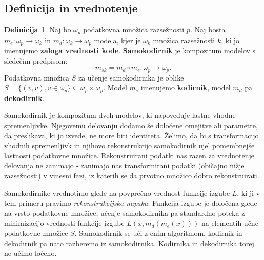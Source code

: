 \documentclass[12pt,a4paper,twoside]{article}
\theoremstyle{definition} %
\newtheorem{definicija}{Definicija}[section]
\theoremstyle{plain} %
\numberwithin{equation}{section}  %
\begin{document}

\subsection{Definicija in vrednotenje}

\begin{definicija}
\label{def-samokodirnik}
Naj bo $\omega_p$ podatkovna množica razsežnosti $p$. Naj bosta $m_e: \omega_p \rightarrow \omega_k$ in $m_d: \omega_k \rightarrow \omega_p$ modela, kjer je $\omega_k$ množica razsežnosti $k$, ki jo imenujemo \textbf{zaloga vrednosti kode}. \textbf{Samokodirnik} je kompozitum modelov s sledečim predpisom:
\[
m_{s k} = m_d \circ m_e : \omega_p \rightarrow \omega_p .
\]
Podatkovna množica $S$ za učenje samokodirnika je oblike $S = \{(v, v), v \in \omega_p\} \subseteq \omega_p \times \omega_p$. Model $m_e$ imenujemo \textbf{kodirnik}, model $m_d$ pa \textbf{dekodirnik}.
\end{definicija}

Samokodirnik je kompozitum dveh modelov, ki napoveduje lastne vhodne spremenljivke. 
Njegovemu delovanju dodamo še določene omejitve ali parametre, da preslikava, ki jo izvede, ne more biti identiteta. 
Želimo, da bi s transformacijo vhodnih spremenljivk in njihovo rekonstrukcijo samokodirnik ujel pomembnejše lastnosti podatkovne množice. 
Rekonstruirani podatki nas razen za vrednotenje delovanja ne zanimajo - zanimajo nas transformirani podatki (običajno nižje razsežnosti) v vmesni fazi, iz katerih se da prvotno množico dobro rekonstruirati.

Samokodirnike vrednotimo glede na povprečno vrednost funkcije izgube $L$, ki ji v tem primeru pravimo \emph{rekonstrukcijska napaka}. 
Funkcija izgube je določena glede na vrsto podatkovne množice, učenje samokodirnika pa standardno poteka z minimizacijo vrednosti funkcije izgube $L(x,m_d(m_e(x)))$ na elementih učne podatkovne množice $S$. 
Samokodirnik se uči z enim algoritmom, kodirnik in dekodirnik pa nato razberemo iz samokodirnika. Kodirnika in dekodirnika torej ne učimo ločeno.
\end{document}
